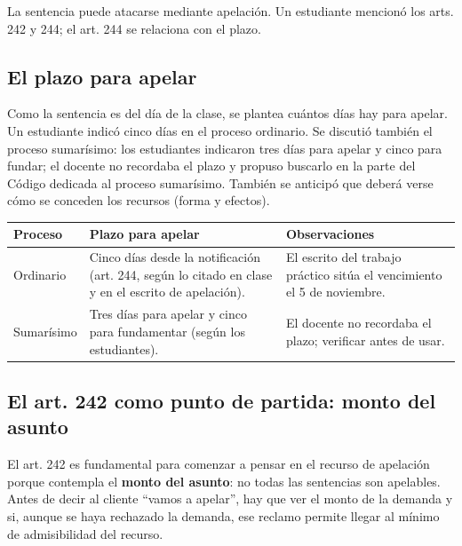 \documentclass[12pt,oneside]{book}
\begin{document}
La sentencia puede atacarse mediante apelaci\'on. Un estudiante mencion\'o los arts. 242 y 244; el art. 244 se relaciona con el plazo.

\subsection{El plazo para apelar}

Como la sentencia es del d\'ia de la clase, se plantea cu\'antos d\'ias hay para apelar. Un estudiante indic\'o cinco d\'ias en el proceso ordinario. Se discuti\'o tambi\'en el proceso sumar\'isimo: los estudiantes indicaron tres d\'ias para apelar y cinco para fundar; el docente no recordaba el plazo y propuso buscarlo en la parte del C\'odigo dedicada al proceso sumar\'isimo. Tambi\'en se anticip\'o que deber\'a verse c\'omo se conceden los recursos (forma y efectos).

\begin{center}
\small
\begin{tabularx}{\textwidth}{@{}p{2.4cm}p{4.6cm}X@{}}
\toprule
\textbf{Proceso} & \textbf{Plazo para apelar} & \textbf{Observaciones} \\
\midrule
Ordinario & Cinco d\'ias desde la notificaci\'on (art. 244, seg\'un lo citado en clase y en el escrito de apelaci\'on). & El escrito del trabajo pr\'actico sit\'ua el vencimiento el 5 de noviembre. \\
\addlinespace
Sumar\'isimo & Tres d\'ias para apelar y cinco para fundamentar (seg\'un los estudiantes). & El docente no recordaba el plazo; verificar antes de usar. \\
\bottomrule
\end{tabularx}
\end{center}


\subsection{El art. 242 como punto de partida: monto del asunto}

El art. 242 es fundamental para comenzar a pensar en el recurso de apelaci\'on porque contempla el \textbf{monto del asunto}: no todas las sentencias son apelables. Antes de decir al cliente ``vamos a apelar'', hay que ver el monto de la demanda y si, aunque se haya rechazado la demanda, ese reclamo permite llegar al m\'inimo de admisibilidad del recurso.
\end{document}
